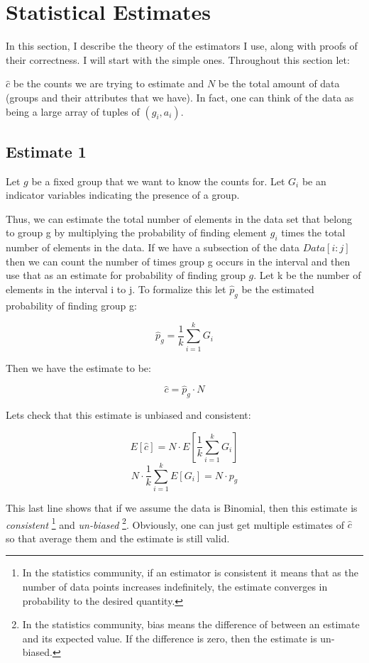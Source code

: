 \documentclass[a4paper]{article}
\begin{document}
\section{Statistical Estimates}

In this section, I describe the theory of the estimators I use, along with proofs of their correctness.
I will start with the simple ones.
Throughout this section let:

$\hat{c}$ be the counts we are trying to estimate and $N$ be the total amount of data (groups and their attributes that we have). In fact, one can think of the data as being a large array of tuples of $(g_i, a_{i})$.

\subsection{Estimate 1}

Let $g$ be a fixed group that we want to know the counts for.
Let $G_i$ be an indicator variables indicating the presence of a group.


Thus, we can estimate the total number of elements in the data set that belong to group g by multiplying the probability of finding element $g_i$ times the total number of elements in the data. 
If we have a subsection of the data $Data[i:j]$ then we can count the number of times group g occurs in the interval and then use that as an estimate for probability of finding group $g$.
Let k be the number of elements in the interval i to j.
To formalize this let $\hat{p}_g$ be the estimated probability of finding group g:

$$ \hat{p}_g = \frac{1}{k} \sum^{k}_{i=1} G_i $$

Then we have the estimate to be:

$$ \hat{c} = \hat{p}_g \cdot N $$

Lets check that this estimate is unbiased and consistent:

$$E[ \hat{c} ] = N \cdot E[\frac{1}{k} \sum^{k}_{i=1} G_i ]$$
$$N \cdot \frac{1}{k} \sum^{k}_{i=1} E[G_i ] = N \cdot p_g$$

This last line shows that if we assume the data is Binomial, then this estimate is {\it consistent} \footnote{In the statistics community, if an estimator is consistent it means that as the number of data points increases indefinitely, the estimate converges in probability to the desired quantity.} and {\it un-biased} \footnote{In the statistics community, bias means the difference of between an estimate and its expected value. If the difference is zero, then the estimate is un-biased.}.
Obviously, one can just get multiple estimates of $\hat{c}$ so that average them and the estimate is still valid.
\end{document}
